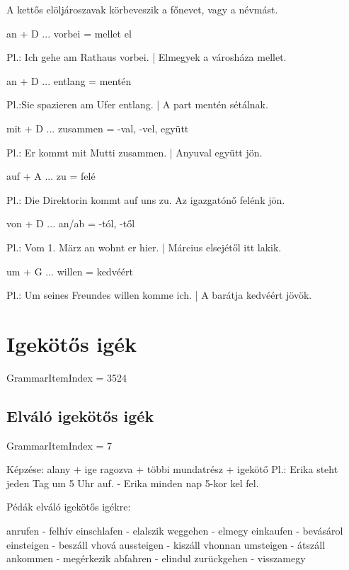 \documentclass{article}
\newenvironment{desc}{\verbatim}{\endverbatim}
\begin{document}
\begin{desc}
A kettős elöljároszavak körbeveszik a főnevet, vagy a névmást.

\begin{enumerate}
an + D ... vorbei = mellet el

Pl.: Ich gehe am Rathaus vorbei. | Elmegyek a városháza mellet.

an + D ... entlang = mentén

Pl.:Sie spazieren am Ufer entlang. | A part mentén sétálnak.

mit + D ... zusammen = -val, -vel, együtt

Pl.: Er kommt mit Mutti zusammen. | Anyuval együtt jön.

auf + A ... zu = felé

Pl.: Die Direktorin kommt auf uns zu. Az igazgatónő felénk jön.

von + D ... an/ab = -tól, -től

Pl.: Vom 1. März an wohnt er hier. | Március elsejétől itt lakik.

um + G ... willen = kedvéért

Pl.: Um seines Freundes willen komme ich. | A barátja kedvéért jövök. 
\end{enumerate}
\end{desc}

\section{Igekötős igék}

GrammarItemIndex = 3524

\subsection{Elváló igekötős igék}

GrammarItemIndex = 7

\begin{desc}
Képzése: alany + ige ragozva + többi mundatrész + igekötő
Pl.: Erika steht jeden Tag um 5 Uhr auf. - Erika minden nap 5-kor kel fel.

Pédák elváló igekötős igékre:

anrufen - felhív
einschlafen - elalszik
weggehen - elmegy
einkaufen - bevásárol
einsteigen - beszáll vhová
aussteigen - kiszáll vhonnan
umsteigen - átszáll
ankommen - megérkezik
abfahren - elindul
zurückgehen - visszamegy

\end{desc}
\end{document}
